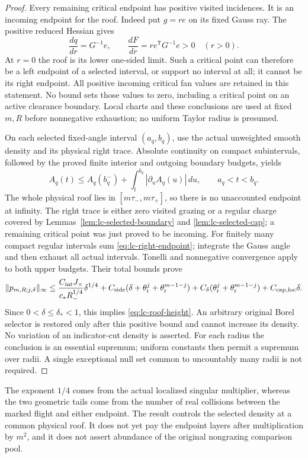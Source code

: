 \begin{proof}
Every remaining critical endpoint has positive visited incidences.
It is an incoming endpoint for the roof.  Indeed put $g=r e$ on
its fixed Gauss ray.  The positive reduced Hessian gives
\[
 \frac{dq}{dr}=G^{-1}e,\qquad
 \frac{dF}{dr}=r e^{\mathsf T}G^{-1}e>0\quad(r>0).
\]
At $r=0$ the roof is its lower one-sided limit.  Such a critical
point can therefore be a left endpoint of a selected interval, or
support no interval at all; it cannot be its right endpoint.  All
positive incoming critical fan values are retained in this statement.
No bound sets those values to zero, including a critical point on
an active clearance boundary.  Local charts and these conclusions
are used at fixed $m,R$ before nonnegative exhaustion; no uniform
Taylor radius is presumed.

On each selected fixed-angle interval $(a_q,b_q)$, use the actual
unweighted smooth density and its physical right trace.  Absolute
continuity on compact subintervals, followed by the proved finite
interior and outgoing boundary budgets, yields
\begin{equation}\label{eq:lc-right-endpoint}
 A_q(t)\le A_q(b_q^-)+\int_t^{b_q}|\partial_uA_q(u)|\,du,
                                      \qquad a_q<t<b_q.
\end{equation}
The whole physical roof lies in $[m\tau_-,m\tau_+]$, so there is
no unaccounted endpoint at infinity.  The right trace is either
zero visited grazing or a regular charge covered by
Lemmas~\ref{lem:lc-selected-boundary} and
\ref{lem:lc-selected-cap}; a remaining critical point was just
proved to be incoming.  For finitely many compact regular intervals
sum \eqref{eq:lc-right-endpoint}; integrate the Gauss angle and
then exhaust all actual intervals.  Tonelli and nonnegative
convergence apply to both upper budgets.  Their total bounds prove
\[
 \|p_{m,R;j,\delta}\|_\infty
 \le \frac{C_{\rm int}J_\times}{c_*R_-^{1/4}}\delta^{1/4}
       +C_{\rm side}(\delta+\theta_{\rm r}^j
                               +\theta_{\rm r}^{m-1-j})
       +C_\delta(\theta_{\rm r}^j+\theta_{\rm r}^{m-1-j})
       +C_{\rm cap,loc}\delta.
\]
Since $0<\delta\le\delta_*<1$, this implies
\eqref{eq:lc-roof-height}.  An arbitrary original Borel selector is
restored only after this positive bound and cannot increase its
density.  No variation of an indicator-cut density is asserted.
For each radius the conclusion is an essential supremum; uniform
constants then permit a supremum over radii.  A single exceptional
null set common to uncountably many radii is not required.
\end{proof}

The exponent $1/4$ comes from the actual localized singular multiplier,
whereas the two geometric tails come from the number of real collisions
between the marked flight and either endpoint.  The result controls the
selected density at a common physical roof.  It does not yet pay the
endpoint layers after multiplication by $m^2$, and it does not assert
abundance of the original nongrazing comparison pool.
